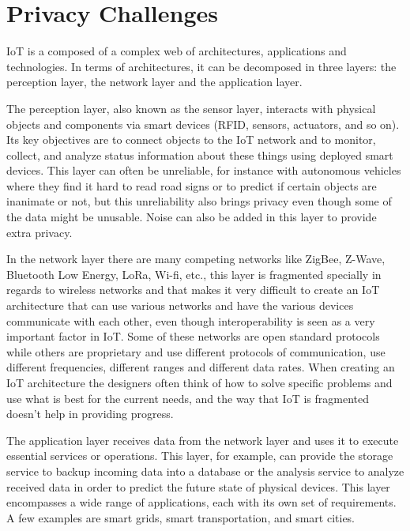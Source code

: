 %
%

\section{Privacy Challenges}

IoT is a composed of a complex web of architectures, applications and technologies.
In terms of architectures, it can be decomposed in three layers: the perception
layer, the network layer and the application layer.

The perception layer, also known as the sensor layer, interacts with physical
objects and components via smart devices (RFID, sensors, actuators, and
so on). Its key objectives are to connect objects to the IoT network and
to monitor, collect, and analyze status information about these things using
deployed smart devices. This layer can often be unreliable, for instance
with autonomous vehicles where they find it hard to read road signs or to
predict if certain objects are inanimate or not, but this unreliability
also brings privacy even though some of the data might be unusable. Noise
can also be added in this layer to provide extra privacy.

In the network layer there are many competing networks like ZigBee, Z-Wave,
Bluetooth Low Energy, LoRa, Wi-fi, etc., this layer is fragmented specially
in regards to wireless networks and that makes it very difficult to create
an IoT architecture that can use various networks and have the various
devices communicate with each other, even though interoperability is seen
as a very important factor in IoT. Some of these networks are open standard
protocols while others are proprietary and use different protocols of communication,
use different frequencies, different ranges and different data rates. When
creating an IoT architecture the designers often think of how to solve
specific problems and use what is best for the current needs, and the way
that IoT is fragmented doesn't help in providing progress.

The application layer receives data from the network layer and uses it to
execute essential services or operations. This layer, for example, can provide
the storage service to backup incoming data into a database or the analysis
service to analyze received data in order to predict the future state of
physical devices. This layer encompasses a wide range of applications, each
with its own set of requirements. A few examples are smart grids, smart
transportation, and smart cities.

